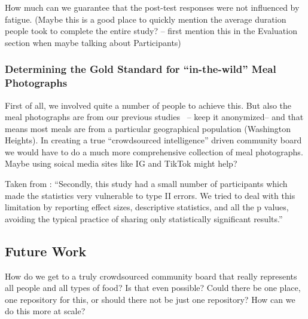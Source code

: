 How much can we guarantee that the post-test responses were not influenced by fatigue. (Maybe this is a good place to quickly mention the average duration people took to complete the entire study? -- first mention this in the Evaluation section when maybe talking about Participants)


\subsubsection{Determining the Gold Standard for ``in-the-wild'' Meal Photographs}
First of all, we involved quite a number of people to achieve this. But also the meal photographs are from our previous studies~\cite{} -- keep it anonymized-- and that means most meals are from a particular geographical population (Washington Heights). In creating a true ``crowdsourced intelligence'' driven community board we would have to do a much more comprehensive collection of meal photographs. Maybe using soical media sites like IG and TikTok might help?


Taken from \cite{cuthbert2019effects}:
``Secondly, this study had a small number of participants
which made the statistics very vulnerable to type II errors.
We tried to deal with this limitation by reporting effect sizes,
descriptive statistics, and all the p values, avoiding the typical
practice of sharing only statistically significant results.''

\subsection{Future Work}

How do we get to a truly crowdsourced community board that really represents all people and all types of food? Is that even possible? Could there be one place, one repository for this, or should there not be just one repository? How can we do this more at scale?

